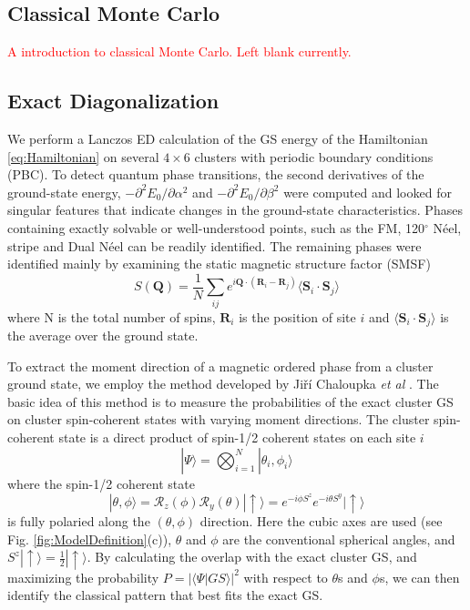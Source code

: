 \documentclass[aps,prb,reprint,amsfonts,amsmath,amssymb,showpacs,groupedaddress,superscriptaddress]{revtex4-1}
\begin{document}
\subsection{Classical Monte Carlo}
\textcolor{red}{A introduction to classical Monte Carlo. Left blank currently.}

\subsection{Exact Diagonalization}
We perform a Lanczos ED calculation of the GS energy of the Hamiltonian \eqref{eq:Hamiltonian} on several $4 \times 6$ clusters with periodic boundary conditions (PBC). To detect quantum phase transitions, the second derivatives of the ground-state energy, $-\partial^2E_0/\partial\alpha^2$ and $-\partial^2E_0/\partial\beta^2$ were computed and looked for singular features that indicate changes in the ground-state characteristics. Phases containing exactly solvable or well-understood points, such as the FM, 120$^\circ$ N\'{e}el, stripe and Dual N\'{e}el can be readily identified. The remaining phases were identified mainly by examining the static magnetic structure factor (SMSF)
\begin{equation}
    S(\mathbf{Q}) = \frac{1}{N} \sum_{ij}e^{i\mathbf{Q}\cdot(\mathbf{R}_i - \mathbf{R}_j)} \langle \mathbf{S}_i \cdot \mathbf{S}_j \rangle
    \label{eq:StaticStructureFactor}
\end{equation}
where N is the total number of spins, $\mathbf{R}_i$ is the position of site $i$ and $\langle \mathbf{S}_i \cdot \mathbf{S}_j \rangle$ is the average over the ground state.

To extract the moment direction of a magnetic ordered phase from a cluster ground state, we employ the method developed by Ji\v{r}\'{i} Chaloupka \emph{et  al} \cite{PhysRevB.94.064435}. The basic idea of this method is to measure the probabilities of the exact cluster GS on cluster spin-coherent states with varying moment directions. The cluster spin-coherent state is a direct product of spin-1/2 coherent states on each site $i$
\begin{equation}
    |\Psi\rangle = \bigotimes_{i=1}^N|\theta_i,\phi_i\rangle
    \label{eq:ClusterCoherentState}
\end{equation}
where the spin-1/2 coherent state
\begin{equation}
    |\theta, \phi \rangle = \mathcal{R}_z(\phi) \mathcal{R}_y(\theta) |\uparrow \rangle = e^{-i\phi S^z} e^{-i\theta S^y} |\uparrow\rangle
    \label{eq:Spin-1/2CoherentState}
\end{equation}
is fully polaried along the $(\theta, \phi)$ direction. Here the cubic axes are used (see Fig. \ref{fig:ModelDefinition}(c)), $\theta$ and $\phi$ are the conventional spherical angles, and $S^z |\uparrow \rangle = \frac{1}{2}|\uparrow \rangle$. By calculating the overlap with the exact cluster GS, and maximizing the probability $P = |\langle \Psi | GS \rangle|^2$ with respect to $\theta$s and $\phi$s, we can then identify the classical pattern that best fits the exact GS.
\end{document}
